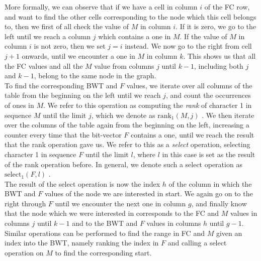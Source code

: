 \documentclass[a4paper,12pt,twoside,BCOR=10mm]{scrbook}
\begin{document}
More formally, we can observe that
if we have a cell in column $ i $ of the FC row, and want to find the other cells corresponding to
the node which this cell belongs to, then we first of all check the value of $ M $ in column $ i $.
If it is zero, we go to the left until we reach a column $ j $ which contains a one in $ M $.
If the value of $ M $ in column $ i $ is not zero, then we set $ j = i $ instead.
We now go to the right from cell $ j + 1 $ onwards, until we encounter a one in $ M $ in column $ k $.
This shows us that all the FC values and all the $ M $ value
from columns $ j $ until $ k - 1 $, including both $ j $ and $ k - 1 $,
belong to the same node in the graph. \\
To find the corresponding BWT and $ F $ values, we iterate over all columns of the table from the beginning on
the left until we reach $ j $, and count the occurrences of ones in $ M $.
We refer to this operation as computing the \textit{rank} of character 1 in sequence $ M $ until the limit $ j $,
which we denote as $ \textrm{rank}_1 ( M, j ) $ \citep{Siren2009}.\label{def:rank}
We then iterate over the columns of the table again from the beginning on the left,
increasing a counter every time that the bit-vector $ F $ contains a one, until we reach
the result that the rank operation gave us.
We refer to this as a \textit{select} operation, selecting character 1 in sequence $ F $ until the limit $ l $,
where $ l $ in this case is set as the result of the rank operation before. In general,
we denote such a select operation as $ \textrm{select}_1 ( F, l ) $ \citep{Siren2009}.\label{def:select} \\
The result of the select operation is now the index $ h $ of the column in which the BWT and $ F $ values
of the node we are interested in start.
We again go on to the right through $ F $ until we encounter the next one in column $ g $,
and finally know that the node which we were interested in corresponds to the
FC and $ M $ values in columns $ j $ until $ k - 1 $ and to the BWT and $ F $ values in columns $ h $ until $ g - 1 $. \\
Similar operations can be performed to find the range in FC and $ M $ given an index into the BWT,
namely ranking the index in $ F $ and calling a select operation on $ M $ to find the corresponding start.
\end{document}
